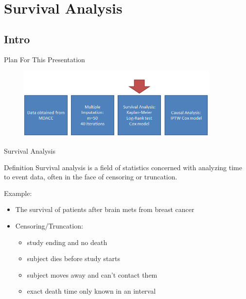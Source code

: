 \section{Survival Analysis}

\subsection{Intro}

\begin{frame}[noframenumbering]{Plan For This Presentation}
  \begin{figure}[h!]
  \centering
    \includegraphics[width=0.9\textwidth]{surv_flow}
\label{fig:surv_flow}
\end{figure} 
\end{frame}

\begin{frame}{Survival Analysis}
\begin{block}{Definition}
Survival analysis is a field of statistics concerned with analyzing time to 
event data, often in the face of censoring or truncation.
\end{block}
Example:
\begin{itemize}
 \item The survival of patients after brain mets from breast cancer
 \item Censoring/Truncation:
 \begin{itemize}
  \item study ending and no death 
  \item subject dies before study starts
  \item subject moves away and can't contact them 
 \item exact death time only known in an interval
 \end{itemize}

\end{itemize}
\end{frame}

